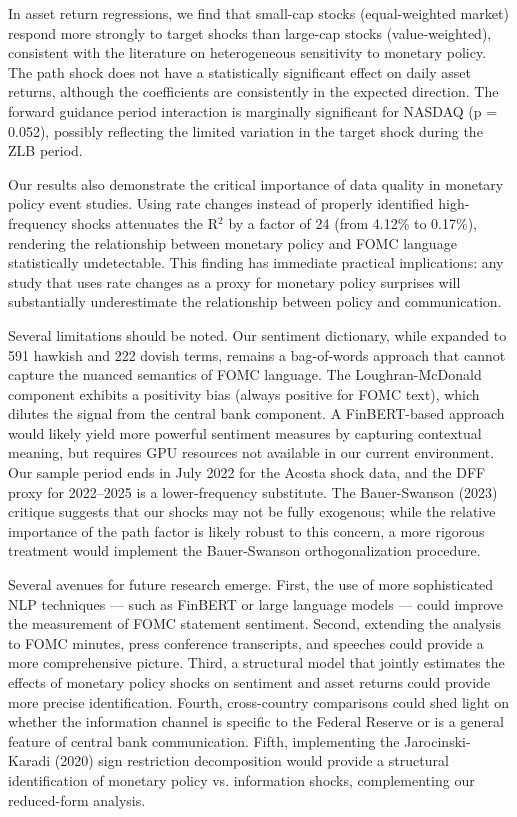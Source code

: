 \documentclass[12pt]{article}
\begin{document}
In asset return regressions, we find that small-cap stocks (equal-weighted market) respond more strongly to target shocks than large-cap stocks (value-weighted), consistent with the literature on heterogeneous sensitivity to monetary policy. The path shock does not have a statistically significant effect on daily asset returns, although the coefficients are consistently in the expected direction. The forward guidance period interaction is marginally significant for NASDAQ (p = 0.052), possibly reflecting the limited variation in the target shock during the ZLB period.

Our results also demonstrate the critical importance of data quality in monetary policy event studies. Using rate changes instead of properly identified high-frequency shocks attenuates the R$^2$ by a factor of 24 (from 4.12\% to 0.17\%), rendering the relationship between monetary policy and FOMC language statistically undetectable. This finding has immediate practical implications: any study that uses rate changes as a proxy for monetary policy surprises will substantially underestimate the relationship between policy and communication.

Several limitations should be noted. Our sentiment dictionary, while expanded to 591 hawkish and 222 dovish terms, remains a bag-of-words approach that cannot capture the nuanced semantics of FOMC language. The Loughran-McDonald component exhibits a positivity bias (always positive for FOMC text), which dilutes the signal from the central bank component. A FinBERT-based approach would likely yield more powerful sentiment measures by capturing contextual meaning, but requires GPU resources not available in our current environment. Our sample period ends in July 2022 for the Acosta shock data, and the DFF proxy for 2022--2025 is a lower-frequency substitute. The Bauer-Swanson (2023) critique suggests that our shocks may not be fully exogenous; while the relative importance of the path factor is likely robust to this concern, a more rigorous treatment would implement the Bauer-Swanson orthogonalization procedure.

Several avenues for future research emerge. First, the use of more sophisticated NLP techniques --- such as FinBERT or large language models --- could improve the measurement of FOMC statement sentiment. Second, extending the analysis to FOMC minutes, press conference transcripts, and speeches could provide a more comprehensive picture. Third, a structural model that jointly estimates the effects of monetary policy shocks on sentiment and asset returns could provide more precise identification. Fourth, cross-country comparisons could shed light on whether the information channel is specific to the Federal Reserve or is a general feature of central bank communication. Fifth, implementing the Jarocinski-Karadi (2020) sign restriction decomposition would provide a structural identification of monetary policy vs. information shocks, complementing our reduced-form analysis.
\end{document}
